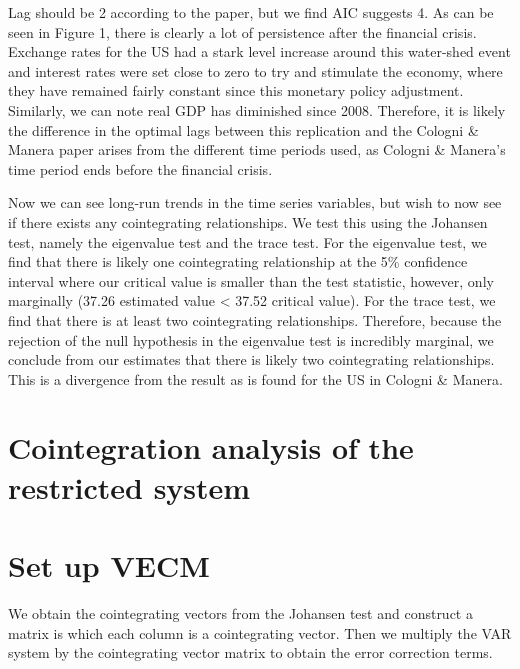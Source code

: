 \documentclass[11pt,preprint, authoryear]{elsarticle}
\numberwithin{equation}{section}
\numberwithin{figure}{section}
\numberwithin{table}{section}
\begin{document}
Lag should be 2 according to the paper, but we find AIC suggests 4. As
can be seen in Figure 1, there is clearly a lot of persistence after the
financial crisis. Exchange rates for the US had a stark level increase
around this water-shed event and interest rates were set close to zero
to try and stimulate the economy, where they have remained fairly
constant since this monetary policy adjustment. Similarly, we can note
real GDP has diminished since 2008. Therefore, it is likely the
difference in the optimal lags between this replication and the Cologni
\& Manera paper arises from the different time periods used, as Cologni
\& Manera's time period ends before the financial crisis.

Now we can see long-run trends in the time series variables, but wish to
now see if there exists any cointegrating relationships. We test this
using the Johansen test, namely the eigenvalue test and the trace test.
For the eigenvalue test, we find that there is likely one cointegrating
relationship at the 5\% confidence interval where our critical value is
smaller than the test statistic, however, only marginally (37.26
estimated value \textless{} 37.52 critical value). For the trace test,
we find that there is at least two cointegrating relationships.
Therefore, because the rejection of the null hypothesis in the
eigenvalue test is incredibly marginal, we conclude from our estimates
that there is likely two cointegrating relationships. This is a
divergence from the result as is found for the US in Cologni \& Manera.

\hypertarget{cointegration-analysis-of-the-restricted-system}{%
\section{Cointegration analysis of the restricted
system}\label{cointegration-analysis-of-the-restricted-system}}

\hypertarget{set-up-vecm}{%
\section{Set up VECM}\label{set-up-vecm}}

We obtain the cointegrating vectors from the Johansen test and construct
a matrix is which each column is a cointegrating vector. Then we
multiply the VAR system by the cointegrating vector matrix to obtain the
error correction terms.
\end{document}
